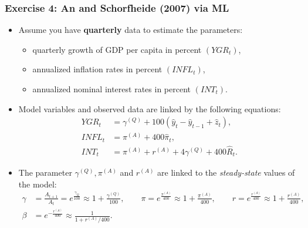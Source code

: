 \documentclass{beamer} %
\begin{document}
\begin{frame}\frametitle{Exercise 4: An and Schorfheide (2007) via ML}
\begin{itemize}
\item Assume you have \textbf{quarterly} data to estimate the parameters:
\begin{itemize}
  \item quarterly growth of GDP per capita in percent $(YGR_t)$,
  \item annualized inflation rates in percent $(INFL_t)$,
  \item annualized nominal interest rates in percent $(INT_t)$.
\end{itemize}
\item Model variables and observed data are linked by the following equations:
\begin{align*}
  YGR_t &= \gamma^{(Q)} + 100(\widehat{y}_t-\widehat{y}_{t-1}+\widehat{z}_t),\\
  INFL_t &= \pi^{(A)} + 400 \widehat{\pi}_t,\\
  INT_t &= \pi^{(A)} + r^{(A)} + 4 \gamma^{(Q)} + 400 \widehat{R}_t.
\end{align*}
\item The parameter $\gamma^{(Q)}, \pi^{(A)}$ and $r^{(A)}$ are linked to the \emph{steady-state} values of the model:
\scriptsize\begin{align*}
  \gamma &=\frac{A_{t+1}}{A_t}= e^{\frac{\gamma_Q}{100}} \approx 1+\frac{\gamma^{(Q)}}{100}, \qquad   \pi = e^{\frac{\pi^{(A)}}{400}} \approx 1+\frac{\pi^{(A)}}{400},\qquad r = e^{\frac{r^{(A)}}{400}} \approx 1+\frac{r^{(A)}}{400},\\
  \beta&=e^{-\frac{r^{(A)}}{400}} \approx \frac{1}{1+r^{(A)}/400}.
\end{align*}
\end{itemize}
\end{frame}
\end{document}
